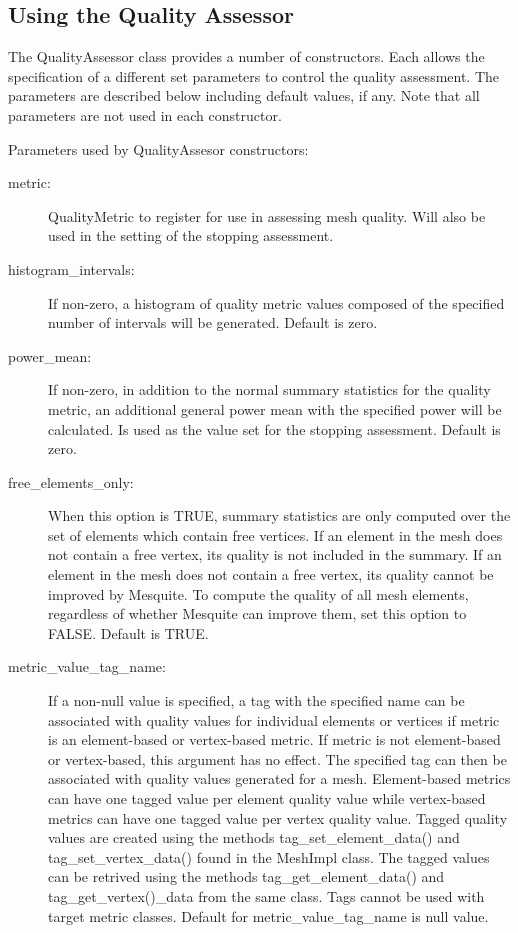 \subsection{Using the Quality Assessor}

  The QualityAssessor class provides a number of constructors.	Each allows the specification of a different set parameters to control the quality assessment.	The parameters are described below including default values, if any. Note that all parameters are not used in each constructor.

\label{QA_params}
Parameters used by QualityAssesor constructors:
\begin{description}
\item[metric:]	 QualityMetric to register for use in assessing mesh quality.  Will also be used in the setting of the stopping assessment.

\item[histogram\_intervals:]   If non-zero, a histogram of quality metric values composed of the specified number of intervals will be generated.  Default is zero.
\item[power\_mean:] If non-zero, in addition to the normal summary statistics for the quality metric, an additional general power mean with the specified power will be calculated.  Is used as the value set for the stopping assessment.  Default is zero.

\item[free\_elements\_only:] When this option is TRUE, summary statistics are only computed over the set of elements which contain free vertices. If an element in the mesh does not contain a free vertex, its quality is not included in the summary.	 If an element in the mesh does not contain a free vertex, its quality cannot be improved by Mesquite.	To compute the quality of all mesh elements, regardless of whether Mesquite can improve them, set this option to FALSE.	 Default is TRUE.

\item[metric\_value\_tag\_name:] If a non-null value is specified, a tag with the specified name can be associated with quality values for individual elements or vertices if metric is an element-based or vertex-based metric.  If metric is not element-based or vertex-based, this argument has no effect. The specified tag can then be associated with quality values generated for a mesh.  Element-based metrics can have one tagged value per element quality value while vertex-based metrics can have one tagged value per vertex quality value.  Tagged quality values are created using the methods tag\_set\_element\_data() and tag\_set\_vertex\_data() found in the MeshImpl class. The tagged values can be retrived using the methods tag\_get\_element\_data() and tag\_get\_vertex()\_data from the same class.  Tags cannot be used with target metric classes. Default for metric\_value\_tag\_name is null value.


\end{description}
